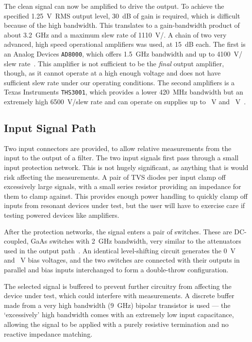 The clean signal can now be amplified to drive the output. To achieve the specified
1.25~V~RMS output level, 30~dB of gain is required, which is difficult because of
the high bandwidth. This translates to a gain-bandwidth product of about 3.2~GHz
and a maximum slew rate of 1110~V/\us. A chain of two very advanced, high speed
operational amplifiers was used, at 15~dB each. The first is an Analog Devices
\texttt{AD8000}, which offers 1.5~GHz bandwidth and up to 4100~V/\us{} slew
rate~\cite{ad8000}. This amplifier is not sufficient to be the \emph{final} output amplifier,
though, as it cannot operate at a high enough voltage and does not have sufficient
slew rate under our operating conditions. The second amplifiers is a Texas Instruments
\texttt{THS3001}, which provides a lower 420~MHz bandwidth but an extremely high
6500~V/\us slew rate and can operate on supplies up to ~V and ~V~\cite{ths3001}.

\subsection{Input Signal Path}
Two input connectors are provided, to allow relative measurements from the input to the
output of a filter. The two input signals first pass through a small input protection
network. This is not hugely significant, as anything that is would risk affecting
the measurements. A pair of TVS diodes per input clamp off excessively large signals,
with a small series resistor providing an impedance for them to clamp against. This
provides enough power handling to quickly clamp off inputs from resonant devices under
test, but the user will have to exercise care if testing powered devices like amplifiers.

After the protection networks, the signal enters a pair of switches. These are
DC-coupled, GaAs switches with 2~GHz bandwidth, very similar to the attenuators
used in the output path~\cite{maswss0162}. An identical level-shifting circuit generates
the 0~V and ~V bias voltages, and the two switches are connected with their
outputs in parallel and bias inputs interchanged to form a double-throw configuration.

The selected signal is buffered to prevent further circuitry from affecting the device
under test, which could interfere with measurements. A discrete buffer made from a very
high bandwidth (9~GHz) bipolar transistor is used --- the `excessively' high bandwidth
comes with an extremely low input capacitance, allowing the signal to be applied with a
purely resistive termination and no reactive impedance matching.

